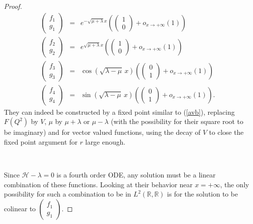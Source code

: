 \documentclass[10pt,a4paper]{amsart}
\begin{document}
\begin{proof}
  \begin{eqnarray*}
    \left(\begin{array}{c}
      f_1\\
      g_1
    \end{array}\right) & = & e^{-\sqrt{\mu + \lambda } x}\left( \left(\begin{array}{c}
       1\\
       0
     \end{array}\right) + o_{x \rightarrow + \infty} (1) \right)\\
    \left(\begin{array}{c}
      f_2\\
      g_2
    \end{array}\right) & = & e^{\sqrt{\mu +  \lambda} x} \left( \left(\begin{array}{c}
       1\\
       0
     \end{array}\right) + o_{x \rightarrow + \infty} (1) \right)\\
    \left(\begin{array}{c}
      f_3\\
      g_3
    \end{array}\right) & = & \cos \left( \sqrt{ \lambda - \mu }\, x
    \right)\left( \left(\begin{array}{c}
       0\\
       1
     \end{array}\right) + o_{x \rightarrow + \infty} (1) \right)\\
    \left(\begin{array}{c}
      f_4\\
      g_4
    \end{array}\right) & = & \sin \left( \sqrt{ \lambda - \mu }\, x
    \right)\left( \left(\begin{array}{c}
       0\\
       1
     \end{array}\right) + o_{x \rightarrow + \infty} (1) \right) .
  \end{eqnarray*}
  They can indeed be constructed by a fixed point similar to (\ref{avb}), replacing $F(Q^2)$ by $V$, $\mu$ by $\mu+\lambda$ or $\mu-\lambda$ (with the possibility for their square root to be imaginary) and for vector valued functions, using the decay of $V$ to close the fixed point argument for $r$ large enough.

\
  
  Since $\mathcal{H}- \lambda = 0$ is a fourth order ODE,
  any solution must be a linear combination of these functions. Looking at
  their behavior near $x = + \infty$, the only possibility for such a
  combination to be in $L^2 (\mathbb{R}, \mathbb{R})$ is for
  the solution to be colinear to $\left(\begin{array}{c}
    f_1\\
    g_1
  \end{array}\right)$.
  

\end{proof}
\end{document}
